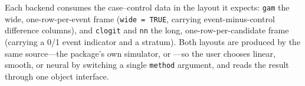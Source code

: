 Each backend consumes the case--control data in the layout it expects:
\texttt{gam} the wide, one-row-per-event frame (\texttt{wide = TRUE}, carrying
event-minus-control difference columns), and \texttt{clogit} and \texttt{nn} the
long, one-row-per-candidate frame (carrying a 0/1 event indicator and a
stratum). Both layouts are produced by the same source---the package's own
simulator, or ---so the user chooses linear, smooth, or neural by
switching a single \texttt{method} argument, and reads the result through one
object interface.
